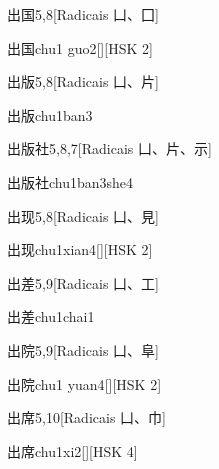 \begin{entry}{出国}{5,8}[Radicais ⼐、⼞]
  \begin{phonetics}{出国}{chu1 guo2}[][HSK 2]
  \end{phonetics}
\end{entry}

\begin{entry}{出版}{5,8}[Radicais ⼐、⽚]
  \begin{phonetics}{出版}{chu1ban3}
  \end{phonetics}
\end{entry}

\begin{entry}{出版社}{5,8,7}[Radicais ⼐、⽚、⽰]
  \begin{phonetics}{出版社}{chu1ban3she4}
  \end{phonetics}
\end{entry}

\begin{entry}{出现}{5,8}[Radicais ⼐、⾒]
  \begin{phonetics}{出现}{chu1xian4}[][HSK 2]
  \end{phonetics}
\end{entry}

\begin{entry}{出差}{5,9}[Radicais ⼐、⼯]
  \begin{phonetics}{出差}{chu1chai1}
  \end{phonetics}
\end{entry}

\begin{entry}{出院}{5,9}[Radicais ⼐、⾩]
  \begin{phonetics}{出院}{chu1 yuan4}[][HSK 2]
  \end{phonetics}
\end{entry}

\begin{entry}{出席}{5,10}[Radicais ⼐、⼱]
  \begin{phonetics}{出席}{chu1xi2}[][HSK 4]
  \end{phonetics}
\end{entry}

